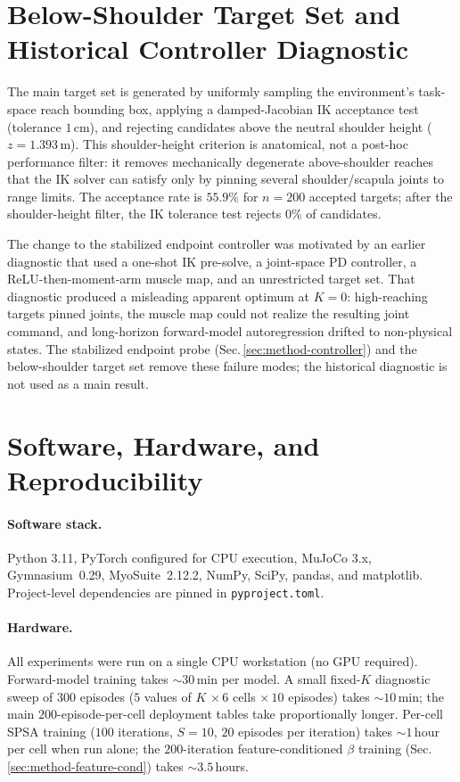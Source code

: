 \documentclass[sn-mathphys,NameDate,iicol]{sn-jnl}
\begin{document}
\begin{appendices}
\clearpage
\section{Below-Shoulder Target Set and Historical Controller Diagnostic}
\label{app:artifact}

The main target set is generated by uniformly sampling the
environment's task-space reach bounding box, applying a damped-Jacobian
IK acceptance test (tolerance $1$\,cm), and rejecting candidates above
the neutral shoulder height ($z\!=\!1.393$\,m). This shoulder-height
criterion is anatomical, not a post-hoc performance filter: it removes
mechanically degenerate above-shoulder reaches that the IK solver can
satisfy only by pinning several shoulder/scapula joints to range
limits. The acceptance rate is $55.9\%$ for $n{=}200$ accepted targets;
after the shoulder-height filter, the IK tolerance test rejects $0\%$
of candidates.

The change to the stabilized endpoint controller was motivated by an
earlier diagnostic that used a one-shot IK pre-solve, a joint-space PD
controller, a ReLU-then-moment-arm muscle map, and an unrestricted
target set. That diagnostic produced a misleading apparent optimum at
$K\!=\!0$: high-reaching targets pinned joints, the muscle map could not
realize the resulting joint command, and long-horizon forward-model
autoregression drifted to non-physical states. The stabilized endpoint
probe (Sec.\,\ref{sec:method-controller}) and the below-shoulder target
set remove these failure modes; the historical diagnostic is not used
as a main result.

\section{Software, Hardware, and Reproducibility}
\label{app:repro}

\paragraph{Software stack.} Python 3.11, PyTorch configured for CPU execution, MuJoCo
3.x, Gymnasium~0.29, MyoSuite~2.12.2, NumPy, SciPy, pandas, and
matplotlib. Project-level dependencies are pinned in
\texttt{pyproject.toml}.

\paragraph{Hardware.} All experiments were run on a single CPU
workstation (no GPU required). Forward-model training takes
$\sim\!30$\,min per model. A small fixed-$K$ diagnostic sweep of
$300$ episodes ($5$ values of $K$ $\times\,6$ cells $\times\,10$ episodes)
takes $\sim\!10$\,min; the main $200$-episode-per-cell deployment
tables take proportionally longer. Per-cell SPSA training ($100$ iterations,
$S\!=\!10$, $20$ episodes per iteration) takes $\sim\!1$\,hour per
cell when run alone; the $200$-iteration feature-conditioned
$\beta$ training (Sec.\,\ref{sec:method-feature-cond}) takes
$\sim\!3.5$\,hours.


\end{appendices}
\end{document}
